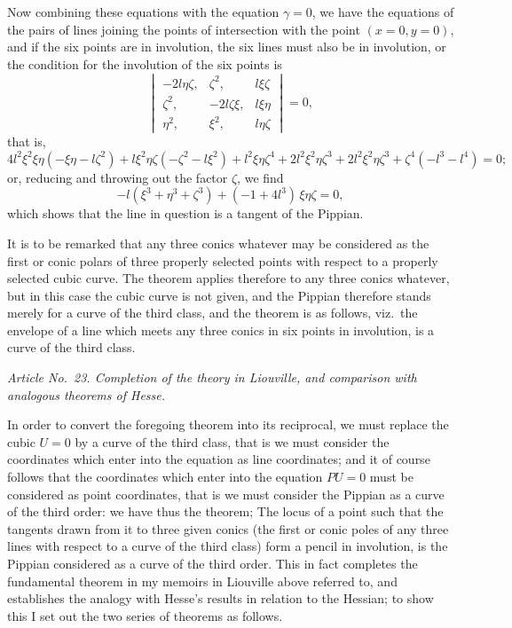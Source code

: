 \documentclass[11pt]{article}
\begin{document}
Now combining these equations with the equation $\gamma = 0$, we have the equations of the pairs of lines joining the points of intersection with the point $(x = 0, y = 0)$, and if the six points are in involution, the six lines must also be in involution, or the condition for the involution of the six points is
\[
\begin{vmatrix}
-2 l\eta\zeta, & \zeta^2, & l\xi\zeta \\
\zeta^2, & -2 l\zeta\xi, & l\xi\eta \\
\eta^2, & \xi^2, & l\eta\zeta
\end{vmatrix} = 0,
\]
that is,
\[
4 l^2 \xi^2 \xi\eta(-\xi\eta - l\zeta^2) + l\xi^2 \eta\zeta(-\zeta^2 - l\xi^2) + l^2 \xi\eta\zeta^4 + 2 l^2 \xi^2 \eta\zeta^3 + 2 l^2 \xi^2 \eta\zeta^3 + \zeta^4(-l^3 - l^4) = 0;
\]
or, reducing and throwing out the factor $\zeta$, we find
\[
-l(\xi^3 + \eta^3 + \zeta^3) + (-1 + 4 l^3)\,\xi\eta\zeta = 0,
\]
which shows that the line in question is a tangent of the Pippian.

It is to be remarked that any three conics whatever may be considered as the first or conic polars of three properly selected points with respect to a properly selected cubic curve. The theorem applies therefore to any three conics whatever, but in this case the cubic curve is not given, and the Pippian therefore stands merely for a curve of the third class, and the theorem is as follows, viz.\ the envelope of a line which meets any three conics in six points in involution, is a curve of the third class.

\medskip

\textit{Article No.~23. Completion of the theory in Liouville, and comparison with analogous theorems of Hesse.}

\medskip

\noindent In order to convert the foregoing theorem into its reciprocal, we must replace the cubic $U = 0$ by a curve of the third class, that is we must consider the coordinates which enter into the equation as line coordinates; and it of course follows that the coordinates which enter into the equation $PU = 0$ must be considered as point coordinates, that is we must consider the Pippian as a curve of the third order: we have thus the theorem; The locus of a point such that the tangents drawn from it to three given conics (the first or conic poles of any three lines with respect to a curve of the third class) form a pencil in involution, is the Pippian considered as a curve of the third order. This in fact completes the fundamental theorem in my memoirs in Liouville above referred to, and establishes the analogy with Hesse's results in relation to the Hessian; to show this I set out the two series of theorems as follows.
\end{document}
